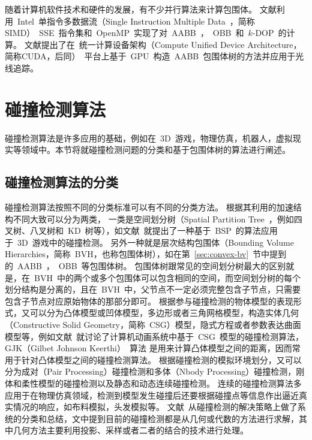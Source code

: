 随着计算机软件技术和硬件的发展，有不少并行算法来计算包围体。
文献利用~Intel~单指令多数据流（Single Instruction
Multiple Data~，简称SIMD）~SSE~指令集和~OpenMP~实现了对~AABB~，~OBB~和~$k$-DOP~的计算。
文献提出了在~统一计算设备架构（Compute Unified Device
Architecture，简称CUDA，后同）~平台上基于~GPU~构造~AABB~包围体树的方法并应用于光线追踪。

\section{碰撞检测算法}
\label{sec:collisiondetection}

碰撞检测算法是许多应用的基础，例如在~3D~游戏，物理仿真，机器人，虚拟现实等领域中。本节将就碰撞检测问题的分类和基于包围体树的算法进行阐述。

\subsection{碰撞检测算法的分类}
\label{sec:cd-category}

碰撞检测算法按照不同的分类标准可以有不同的分类方法。
根据其利用的加速结构不同大致可以分为两类，
一类是空间划分树（Spatial Partition Tree~，例如四叉树、八叉树和~KD~树等），如文献~就提出了一种基于~BSP~的算法应用于~3D~游戏中的碰撞检测。
另外一种就是层次结构包围体（Bounding Volume Hierarchies，简称~BVH，也称包围体树），如在第~\ref{sec:convex-bv}~节中提到的~AABB~，~OBB~等包围体树。
包围体树跟常见的空间划分树最大的区别就是，在~BVH~中的两个或多个包围体可以包含相同的空间，而空间划分树的每个划分结构是分离的，且在~BVH~中，父节点不一定必须完整包含子节点，只需要包含子节点对应原始物体的那部分即可\cite{ericson2005real}。 
根据参与碰撞检测的物体模型的表现形式，又可以分为凸体模型或凹体模型，多边形或者三角网格模型，构造实体几何（Constructive
Solid Geometry，简称~CSG）模型，隐式方程或者参数表达曲面模型等，例如文献~就讨论了计算机动画系统中基于~CSG~模型的碰撞检测算法，GJK（Gilbet Johnson Keerthi）~算法\cite{gilbert1988fast,bergen1999fast}
是用来计算凸体模型之间的距离，因而常用于针对凸体模型之间的碰撞检测算法。
根据碰撞检测的模拟环境划分，又可以分为成对（Pair Processing）碰撞检测和多体（Nbody Processing）碰撞检测，刚体和柔性模型的碰撞检测以及静态和动态连续碰撞检测\cite{lin1998collision}。
连续的碰撞检测算法多应用于在物理仿真领域，检测到模型发生碰撞后还要根据碰撞点等信息作出逼近真实情况的响应，如布料模拟\cite{Brochu2012,Wang2014}，头发模拟\cite{Kaufman2014,Chai2014}等。
文献~从碰撞检测的解决策略上做了系统的分类和总结，文中提到目前的碰撞检测都是从几何或代数的方法进行求解，其中几何方法主要利用投影、采样或者二者的结合的技术进行处理。

